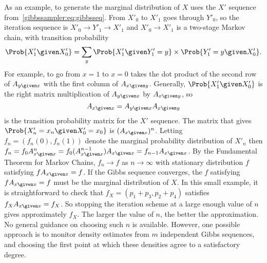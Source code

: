 \documentclass[12pt]{article}
\begin{document}
As an example, to generate the marginal distribution of \( X \) uses the
\( X' \) sequence from~\eqref{gibbssampler:eq:gibbsseq}.  From \( X'_0 \)
to \( X'_1 \) goes through \( Y'_0 \), so the iteration sequence is \(
X'_0 \to Y'_1 \to X'_1 \) and \( X'_0 \to X'_1 \) is a two-stage Markov
chain, with transition probability
\[
    \Prob{X'_1 \given X'_0} = \sum\limits_y \Prob{X'_1 \given Y'_1 = y}
    \times \Prob{Y'_1 = y \given X'_0}.
\] For example, to go from \( x = 1 \) to \( x = 0 \) takes the dot
product of the second row of \( A_{y \given x} \) with the first column
of \( A_{x \given y} \).  Generally, \( \Prob{X'_1 \given X'_0} \) is
the right matrix multiplication of \( A_{y \given x} \) by \( A_{x
\given y} \), so
\[
    A_{x \given x} = A_{ y \given x } A_{x \given y}
\] is the transition probability matrix for the \( X' \) sequence.  The
matrix that gives \( \Prob{X'_n = x_n \given X'_0 = x_0} \) is \( (A_{x
\given x})^n \).  Letting \( f_n = (f_n(0), f_n(1)) \) denote the
marginal probability distribution of \( X'_n \) then \( f_n = f_0 A^n_{x
\given x} = f_0 (A^{n-1}_{x \given x}) A_{x \given x} = f_{n-1} A_{x
\given x} \).  By the Fundamental Theorem for Markov Chains, \( f_n \to
f \) as \( n \to \infty \) with stationary distribution \( f \)
satisfying \( f A_{x \given x} = f \).  If the Gibbs sequence converges,
the \( f \) satisfying \( f A_{x \given x} = f \) must be the marginal
distribution of \( X \).  In this small example, it is straightforward
to check that \( f_X = ( p_1 + p_3, p_2 + p_4) \) satisfies \( f_X A_{x
\given x} = f_X \).  So stopping the iteration scheme at a large enough
value of \( n \) gives approximately \( f_X \).  The larger the value of
\( n \), the better the approximation.  No general guidance on choosing
such \( n \) is available.  However, one possible approach is to monitor
density estimates from \( m \) independent Gibbs sequences, and choosing
the first point at which these densities agree to a satisfactory degree.
\end{document}
